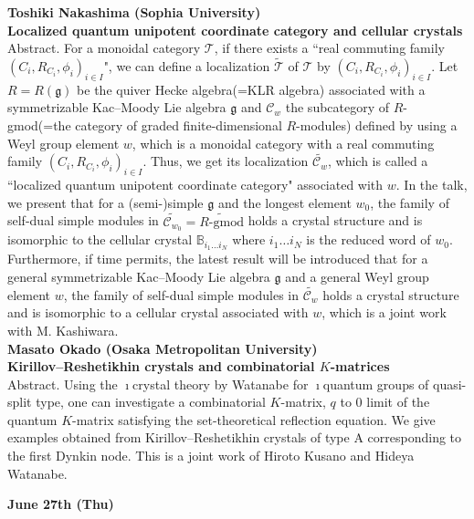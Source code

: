 \documentclass[12pt,landscape]{jarticle}
\begin{document}
\noindent
{\bf\large Toshiki Nakashima (Sophia University)} \\
{\bf Localized quantum unipotent coordinate category and cellular crystals} \\[1mm]
Abstract. 
For a monoidal category $\mathcal{T}$, 
if there exists a ``real commuting family 
$(C_i,R_{C_i},\phi_i)_{i \in I}$", 
we can define a localization $\widetilde{\mathcal{T}}$ of $\mathcal{T}$ 
by 
$(C_i,R_{C_i},\phi_i)_{i \in I}$. 
Let $R = R(\mathfrak{g})$ be the quiver Hecke algebra(=KLR algebra) associated with a symmetrizable Kac--Moody Lie algebra $\mathfrak{g}$ and $\mathscr{C}_w$ 
the subcategory of $R$-gmod(=the category of graded finite-dimensional $R$-modules) defined by using a Weyl group element $w$, 
which is a monoidal category with a real commuting family 
$(C_i,R_{C_i},\phi_i)_{i \in I}$.
Thus, we get its localization $\widetilde{\mathscr{C}_w}$, 
which is called a ``localized quantum unipotent coordinate category" 
associated with $w$. 
In the talk, we present that for a 
(semi-)simple $\mathfrak{g}$ and the longest element $w_0$, 
the family of self-dual simple modules in
$\widetilde{\mathscr{C}_{w_0}} = \widetilde{R\text{-gmod}}$ 
holds a crystal structure and is isomorphic to the cellular crystal
$\mathbb{B}_{i_1 \ldots i_N}$
where $i_1 \ldots i_N$ is the reduced word of $w_0$. 
Furthermore, if time permits,
the latest result will be introduced that for a general 
symmetrizable Kac--Moody Lie algebra $\mathfrak{g}$ 
and a general Weyl group element $w$, 
the family of self-dual simple modules in $\widetilde{\mathscr{C}_w}$ 
holds a crystal structure and is isomorphic to a cellular crystal
associated with $w$, which is a joint work with M. Kashiwara.
\\[5mm]
{\bf\large Masato Okado (Osaka Metropolitan University)} \\ 
{\bf Kirillov--Reshetikhin crystals and combinatorial $K$-matrices} \\[1mm]
Abstract. 
Using the $\imath$crystal theory by Watanabe for $\imath$quantum groups of quasi-split type, one can investigate a combinatorial $K$-matrix, $q$ to $0$ limit of the quantum $K$-matrix satisfying the set-theoretical reflection equation. We give examples obtained from Kirillov--Reshetikhin crystals of type A corresponding to the first Dynkin node. This is a joint work of Hiroto Kusano and Hideya Watanabe.
\\
\hrulefill


\begin{center}
{\bf\Large June 27th (Thu)}
\end{center}
\end{document}
